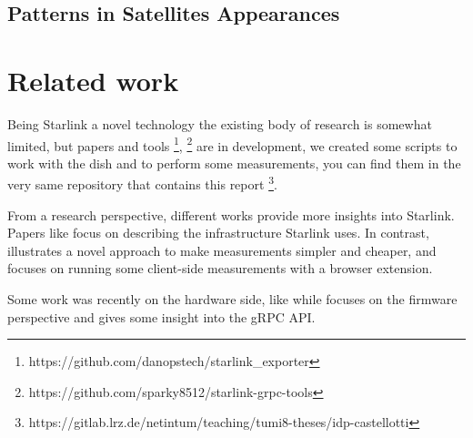 \documentclass[IN,11pt,twoside,openright,idp,english]{tumthesis}
\begin{document}
\subsection{Patterns in Satellites Appearances}


  
\section{Related work}

Being Starlink a novel technology the existing body of research is somewhat limited, but papers and tools \footnote{https://github.com/danopstech/starlink\_exporter}, \footnote{https://github.com/sparky8512/starlink-grpc-tools} are in development, we created some scripts to work with the dish and to perform some measurements, you can find them in the very same repository that contains this report \footnote{https://gitlab.lrz.de/netintum/teaching/tumi8-theses/idp-castellotti}.

From a research perspective, different works provide more insights into Starlink. Papers like \cite{pan2023measuring} focus on describing the infrastructure Starlink uses. In contrast, \cite{izhikevich2023democratizing} illustrates a novel approach to make measurements simpler and cheaper, and \cite{browser-side} focuses on running some client-side measurements with a browser extension.

Some work was recently on the hardware side, like \cite{glitching} while \cite{quarkslab} focuses on the firmware perspective and gives some insight into the gRPC API.


\end{document}
